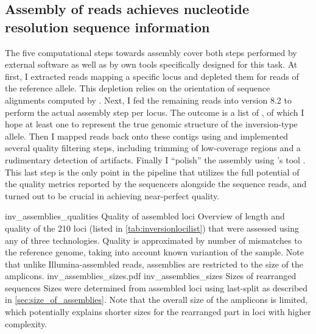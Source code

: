 \subsection{Assembly of \texorpdfstring{\pacbio}{PacBio} reads achieves nucleotide resolution sequence information}
\label{sec:pacbio_assemly}

The five computational steps towards \pacbio assembly cover both steps performed
by external software as well as by own tools specifically designed for this
task. At first, I extracted \pacbio reads mapping a specific locus and depleted
them for reads of the reference allele. This depletion relies on the orientation
of sequence alignments computed by \last. Next, I fed the remaining reads into
\celeraassembler version 8.2 to perform the actual assembly step per locus. The
outcome is a list of ,
of which I hope at least one to represent the true genomic structure of the
inversion-type allele. Then I mapped \pacbio reads back onto these contigs using
\blasr and implemented several quality filtering steps, including trimming of
low-coverage regions and a rudimentary detection of artifacts. Finally I
``polish'' the assembly using \pacbio’s tool \quiver. This last step is the only
point in the pipeline that utilizes the full potential of the quality metrics
reported by the \pacbio sequencers alongside the sequence reads, and turned out
to be crucial in achieving near-perfect quality.


    {inv_assemblies_qualities}
    {Quality of assembled loci}
    {Overview of length and quality of the 210 loci (listed in
    \cref{tab:inversionlocilist}) that were assessed using
    any of three technologies. Quality is approximated by number of mismatches
    to the reference genome, taking into account known variantion of the sample.
    Note that unlike Illumina-assembled reads, \pacbio assemblies are restricted
    to the size of the amplicons.}
        {inv_assemblies_sizes.pdf}
    {inv_assemblies_sizes}
    {Sizes of rearranged sequences}
    {Sizes were determined from assembled loci using \acs{last}-split as
    described in \cref{sec:size_of_assemblies}. Note that the overall size of
    the amplicons is limited, which potentially explains shorter sizes for the
    rearranged part in loci with higher complexity.}


